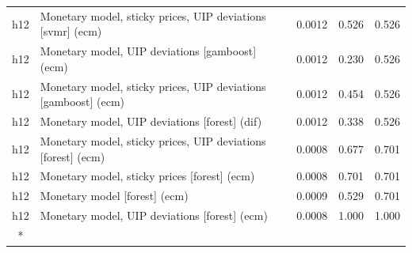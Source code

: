 \begin{ThreePartTable}
\begin{longtable}[t]{cp{5.5cm}ccc}
h12 & \raggedright Monetary model, sticky prices, UIP deviations [svmr] (ecm) & 0.0012 & 0.526 & 0.526\\
h12 & \raggedright Monetary model, UIP deviations [gamboost] (ecm) & 0.0012 & 0.230 & 0.526\\
h12 & \raggedright Monetary model, sticky prices, UIP deviations [gamboost] (ecm) & 0.0012 & 0.454 & 0.526\\
h12 & \raggedright Monetary model, UIP deviations [forest] (dif) & 0.0012 & 0.338 & 0.526\\
h12 & \raggedright Monetary model, sticky prices, UIP deviations [forest] (ecm) & 0.0008 & 0.677 & 0.701\\
h12 & \raggedright Monetary model, sticky prices [forest] (ecm) & 0.0008 & 0.701 & 0.701\\
h12 & \raggedright Monetary model [forest] (ecm) & 0.0009 & 0.529 & 0.701\\
h12 & \raggedright Monetary model, UIP deviations [forest] (ecm) & 0.0008 & 1.000 & 1.000\\*
\end{longtable}
\end{ThreePartTable}
\endgroup{}
